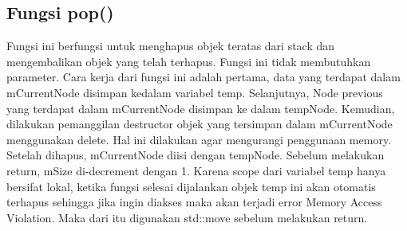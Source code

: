\documentclass[]{article}
\begin{document}
\subsection{Fungsi pop()}

\par
Fungsi ini berfungsi untuk menghapus objek teratas dari stack dan mengembalikan objek yang telah terhapus. Fungsi ini tidak membutuhkan parameter. Cara kerja dari fungsi ini adalah
pertama, data yang terdapat dalam mCurrentNode disimpan kedalam variabel temp. Selanjutnya, Node previous yang terdapat dalam mCurrentNode disimpan ke dalam tempNode.
Kemudian, dilakukan pemanggilan destructor objek yang tersimpan dalam mCurrentNode menggunakan delete. Hal ini dilakukan agar mengurangi penggunaan memory. Setelah dihapus, mCurrentNode diisi dengan tempNode.
Sebelum melakukan return, mSize di-decrement dengan 1. Karena scope dari variabel temp hanya bersifat lokal, ketika fungsi selesai dijalankan objek temp ini akan otomatis terhapus sehingga jika ingin diakses
maka akan terjadi error Memory Access Violation. Maka dari itu digunakan std::move sebelum melakukan return.
\end{document}

